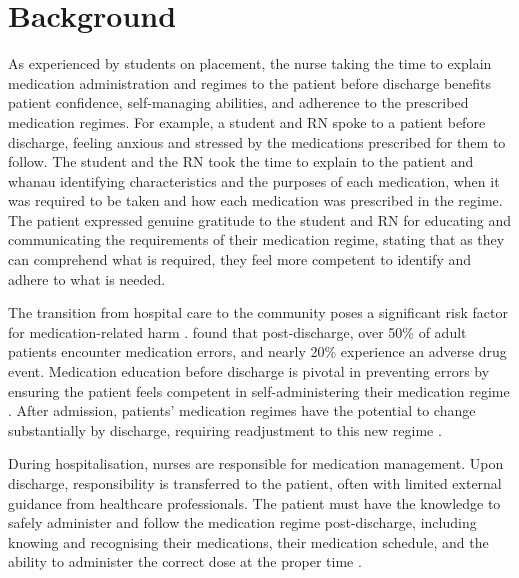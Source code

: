 \documentclass[british,12pt,a4paper]{article}
\begin{document}
\section{Background}
As experienced by students on placement, the nurse taking the time to explain medication administration and regimes to the patient before discharge benefits patient confidence, self-managing abilities, and adherence to the prescribed medication regimes. For example, a student and RN spoke to a patient before discharge, feeling anxious and stressed by the medications prescribed for them to follow. The student and the RN took the time to explain to the patient and whanau identifying characteristics and the purposes of each medication, when it was required to be taken and how each medication was prescribed in the regime. The patient expressed genuine gratitude to the student and RN for educating and communicating the requirements of their medication regime, stating that as they can comprehend what is required, they feel more competent to identify and adhere to what is needed.

The transition from hospital care to the community poses a significant risk factor for medication-related harm \parencite{Flatman2021}. \textcite{Alqenae2020} found that post-discharge, over 50\% of adult patients encounter medication errors, and nearly 20\% experience an adverse drug event. Medication education before discharge is pivotal in preventing errors by ensuring the patient feels competent in self-administering their medication regime \parencite{Hajialibeigloo2021}. After admission, patients' medication regimes have the potential to change substantially by discharge, requiring readjustment to this new regime \parencite{Weir2020}.

During hospitalisation, nurses are responsible for medication management. Upon discharge, responsibility is transferred to the patient, often with limited external guidance from healthcare professionals. The patient must have the knowledge to safely administer and follow the medication regime post-discharge, including knowing and recognising their medications, their medication schedule, and the ability to administer the correct dose at the proper time \parencite{Mortelmans2021}.
\end{document}
